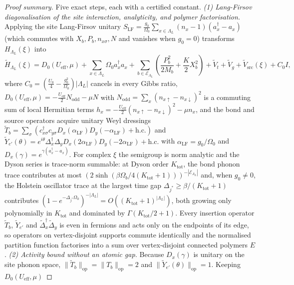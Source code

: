 \documentclass[11pt]{article}
\theoremstyle{definition}
\theoremstyle{remark}
\newcommand{\eff}{\mathrm{eff}}
\newcommand{\Ueff}{U_{\eff}}
\begin{document}
\begin{proof}[Proof summary]
Five exact steps, each with a certified constant.
\emph{(1) Lang-Firsov diagonalisation of the site interaction, analyticity, and
polymer factorisation.} Applying the site Lang-Firsov unitary
$S_{\mathrm{LF}}=\frac{g_0}{\Omega_0}\sum_{x\in\Lambda_L}(n_x-1)(a_x^\dagger-a_x)$
(which commutes with $X_b,P_b,n_{x\sigma},N$ and vanishes when $g_0=0$) transforms
$H_{\Lambda_L}(\xi)$ into
\[
\widetilde{H}_{\Lambda_L}(\xi)
=D_0(\Ueff,\mu)+\sum_{x\in\Lambda_L}\Omega_0 a_x^\dagger a_x
+\sum_{b\in\mathcal{E}_{\Lambda_L}}\left(\frac{P_b^2}{2M_b}+\frac{K}{2}X_b^2\right)
+\widetilde{V}_t+\widetilde{V}_g+\widetilde{V}_{\mathrm{src}}(\xi)+C_0 I,
\]
where $C_0=(\frac{U_0}{4}-\frac{g_0^2}{\Omega_0})|\Lambda_L|$ cancels in every
Gibbs ratio, $D_0(\Ueff,\mu)=-\frac{\Ueff}{2}N_{\mathrm{odd}}-\mu N$ with
$N_{\mathrm{odd}}=\sum_x(n_{x\uparrow}-n_{x\downarrow})^2$ is a commuting sum of
local Hermitian terms $h_x=-\frac{\Ueff}{2}(n_{x\uparrow}-n_{x\downarrow})^2-\mu n_x$,
and the bond and source operators acquire unitary Weyl dressings
$\widetilde{T}_b=\sum_\sigma(c_{x\sigma}^\dagger c_{y\sigma}
D_x(\alpha_{\mathrm{LF}})D_y(-\alpha_{\mathrm{LF}})+\mathrm{h.c.})$ and
$\widetilde{Y}_{e'}(\theta)=e^{i\theta}\Delta_x^\dagger\Delta_y
D_x(2\alpha_{\mathrm{LF}})D_y(-2\alpha_{\mathrm{LF}})+\mathrm{h.c.}$ with
$\alpha_{\mathrm{LF}}=g_0/\Omega_0$ and $D_x(\gamma)=e^{\gamma(a_x^\dagger-a_x)}$.
For complex $\xi$ the semigroup is norm analytic and the Dyson series is trace-norm
summable: at Dyson order $K_{\mathrm{tot}}$, the bond phonon trace contributes at
most $(2\sinh(\beta\Omega_b/4(K_{\mathrm{tot}}+1)))^{-|\mathcal{E}_{\Lambda_L}|}$
and, when $g_0\ne0$, the Holstein oscillator trace at the largest time gap
$\Delta_{j^*}\ge\beta/(K_{\mathrm{tot}}+1)$ contributes
$(1-e^{-\Delta_{j^*}\Omega_0})^{-|\Lambda_L|}=O((K_{\mathrm{tot}}+1)^{|\Lambda_L|})$,
both growing only polynomially in $K_{\mathrm{tot}}$ and dominated by
$\Gamma(K_{\mathrm{tot}}/2+1)$. Every insertion operator $\widetilde{T}_b$,
$\widetilde{Y}_{e'}$ and $\widetilde{\Delta}_x^\dagger\widetilde{\Delta}_y$ is even
in fermions and acts only on the endpoints of its edge, so operators on
vertex-disjoint supports commute identically and the normalised partition function
factorises into a sum over vertex-disjoint connected polymers $E$.
\emph{(2) Activity bound without an atomic gap.} Because $D_x(\gamma)$ is unitary on
the site phonon space, $\|\widetilde{T}_b\|_{\mathrm{op}}=\|T_b\|_{\mathrm{op}}=2$
and $\|\widetilde{Y}_{e'}(\theta)\|_{\mathrm{op}}=1$. Keeping $D_0(\Ueff,\mu)$

\end{proof}
\end{document}

